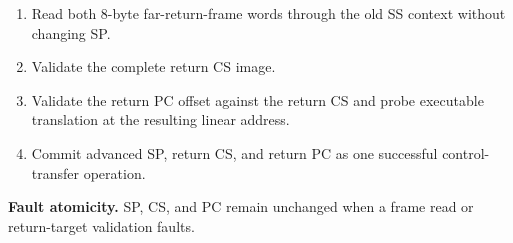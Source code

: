 \begin{enumerate}
\item Read both 8-byte far-return-frame words through the old SS context without changing SP.
\item Validate the complete return CS image.
\item Validate the return PC offset against the return CS and probe executable translation at the resulting linear address.
\item Commit advanced SP, return CS, and return PC as one successful control-transfer operation.
\end{enumerate}

\textbf{Fault atomicity.} SP, CS, and PC remain unchanged when a frame read or return-target validation faults.
